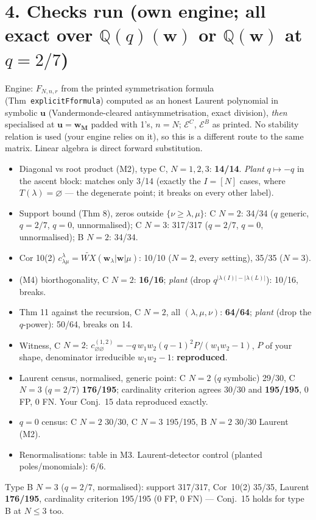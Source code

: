 \documentclass[11pt]{article}
\begin{document}
\section*{4. Checks run (own engine; all exact over $\mathbb Q(q)(\mathbf w)$ or $\mathbb Q(\mathbf w)$ at $q=2/7$)}
Engine: $F_{N,n,r}$ from the printed symmetrisation formula (Thm~\texttt{explicitFformula}) computed as an honest Laurent polynomial in
symbolic $\mathbf u$ (Vandermonde-cleared antisymmetrisation, exact division), \emph{then} specialised at $\mathbf u=\mathbf w_{\mathbf M}$
padded with 1's, $n=N$; $\mathcal E^C$, $\mathcal E^B$ as printed. No stability relation is used (your engine relies on it), so this is a
different route to the same matrix. Linear algebra is direct forward substitution.
\begin{itemize}\itemsep1pt
\item[C1] Diagonal vs root product (M2), type C, $N=1,2,3$: \textbf{14/14}. \emph{Plant} $q\mapsto -q$ in the ascent block: matches only 3/14
 (exactly the $I=[N]$ cases, where $T(\lambda)=\varnothing$ --- the degenerate point; it breaks on every other label).
\item[C2] Support bound (Thm 8), zeros outside $\{\nu\ge\lambda,\mu\}$: C $N=2$: 34/34 ($q$ generic, $q=2/7$, $q=0$, unnormalised); C $N=3$: 317/317 ($q=2/7$, $q=0$, unnormalised); B $N=2$: 34/34.
\item[C3] Cor 10(2) $c^\lambda_{\lambda\mu}=\widetilde{WX}(\mathbf w_\lambda|\mathbf w|\mu)$: 10/10 ($N=2$, every setting), 35/35 ($N=3$).
\item[C4] (M4) biorthogonality, C $N=2$: \textbf{16/16}; \emph{plant} (drop $q^{|\lambda(I)|-|\lambda(L)|}$): 10/16, breaks.
\item[C5] Thm 11 against the recursion, C $N=2$, all $(\lambda,\mu,\nu)$: \textbf{64/64}; \emph{plant} (drop the $q$-power): 50/64, breaks on 14.
\item[C6] Witness, C $N=2$: $c^{(1,2)}_{\varnothing\varnothing}=-q\,w_1w_2(q-1)^2P/(w_1w_2-1)$, $P$ of your shape, denominator irreducible $w_1w_2-1$: \textbf{reproduced}.
\item[C7] Laurent census, normalised, generic point: C $N=2$ ($q$ symbolic) 29/30, C $N=3$ ($q=2/7$) \textbf{176/195}; cardinality criterion agrees 30/30 and \textbf{195/195}, 0 FP, 0 FN. Your Conj.~15 data reproduced exactly.
\item[C8] $q=0$ census: C $N=2$ 30/30, C $N=3$ 195/195, B $N=2$ 30/30 Laurent (M2).
\item[C9] Renormalisations: table in M3. Laurent-detector control (planted poles/monomials): 6/6.
\end{itemize}
Type B $N=3$ ($q=2/7$, normalised): support 317/317, Cor~10(2) 35/35, Laurent \textbf{176/195}, cardinality criterion 195/195 (0 FP, 0 FN) --- Conj.~15 holds for type B at $N\le3$ too.
\end{document}
